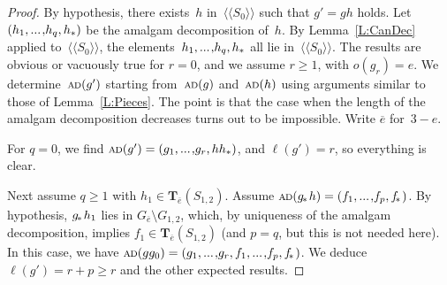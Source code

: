 \documentclass{amsart}
\numberwithin{equation}{section}
\theoremstyle{plain}
\theoremstyle{definition}
\let\ge=\geqslant
\begin{document}
\begin{proof}
By hypothesis, there exists~${h}$ in~${\langle\!\langle{{{S}_0}}\rangle\!\rangle}$ such that ${g}' = {g} {h}$ holds. Let $({h}_1 {, ...\hspace{0.2ex},} {h}_{q}, {h}_*)$ be the amalgam decomposition of~${h}$. By Lemma~\ref{L:CanDec} applied to~${\langle\!\langle{{{S}_0}}\rangle\!\rangle}$, the elements~${h}_1 {, ...\hspace{0.2ex},} {h}_{q}, {h}_*$ all lie in~${\langle\!\langle{{{S}_0}}\rangle\!\rangle}$. The results are obvious or vacuously true for ${r} = 0$, and we assume ${r} \ge 1$, with ${o({{g}_{r}})} = {e}$. We determine~${{\scriptstyle\mathrm{A\hspace{-0.1ex}D}}({{g}'})}$ starting from~${{\scriptstyle\mathrm{A\hspace{-0.1ex}D}}({g})}$ and~${{\scriptstyle\mathrm{A\hspace{-0.1ex}D}}({h})}$ using arguments similar to those of Lemma~\ref{L:Pieces}. The point is that the case when the length of the amalgam decomposition decreases turns out to be impossible. Write $\overline{e}$ for~$3 - {e}$. 

For ${q} = 0$, we find ${{\scriptstyle\mathrm{A\hspace{-0.1ex}D}}({{g}'})} = ({g}_1 {, ...\hspace{0.2ex},} {g}_{r}, {h} {h}_*)$, and ${\ell({{g}'})} = {r}$, so everything is clear.

Next assume ${q} \ge 1$ with ${h}_1 \in {\boldsymbol{T}}_{\overline{e}}({S}_{1,2})$. Assume ${{\scriptstyle\mathrm{A\hspace{-0.1ex}D}}({{{g}_{\hspace{-0.2ex}*\hspace{0.2ex}}} {h}})} = ({f}_1 {, ...\hspace{0.2ex},} {f}_{p}, {{f}_{\hspace{-0.3ex}*\hspace{0.2ex}}})$. By hypothesis, ${{g}_{\hspace{-0.2ex}*\hspace{0.2ex}}} {h}_1$ lies in ${G}_{\overline{e}} \setminus {G}_{1,2}$, which, by uniqueness of the amalgam decomposition, implies ${f}_1 \in {\boldsymbol{T}}_{\overline{e}}({S}_{1,2})$ (and ${p} = {q}$, but this is not needed here). In this case, we have ${{\scriptstyle\mathrm{A\hspace{-0.1ex}D}}({{g} {g}_0})} = ({g}_1 {, ...\hspace{0.2ex},} {g}_{r}, {f}_1 {, ...\hspace{0.2ex},} {f}_{p}, {{f}_{\hspace{-0.3ex}*\hspace{0.2ex}}})$. We deduce ${\ell({{g}'})} = {r} + {p} \ge {r}$ and the other expected results. 


\end{proof}
\end{document}
